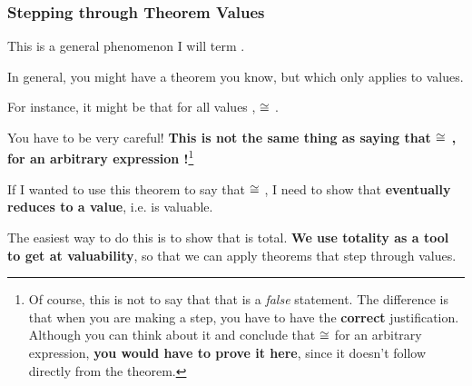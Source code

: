 \documentclass[aspectratio=169]{beamer}
\begin{document}
\begin{frame}[fragile]
  \frametitle{Stepping through Theorem Values}

  This is a general phenomenon I will term .

  \pause
  \vspace{\fill}

  In general, you might have a theorem you know, but which only applies to values.

  \vspace{\fill}

  For instance, it might be that for all values ,  $\cong$
  .

  \pause
  \vspace{\fill}

  You have to be very careful! \textbf{This is not the same thing as saying that
   $\cong$ , for an arbitrary expression !}\footnote{
    Of course, this is not to say that that is a \textit{false} statement.
    The difference is that when you are making a step, you have to have the \textbf{correct}
    justification. Although you can think about it and conclude that  $\cong$ 
    for an arbitrary expression, \textbf{you would have to prove it here}, since it doesn't
    follow directly from the theorem.
  }

  \pause
  \vspace{\fill}

  If I wanted to use this theorem to say that  $\cong$ ,
  I need to show that  \textbf{eventually reduces to a value}, i.e. is valuable.

  \pause
  \vspace{\fill}

  The easiest way to do this is to show that  is total. \textbf{We use totality as
  a tool to get at valuability}, so that we can apply theorems that step through values.
\end{frame}
\end{document}

